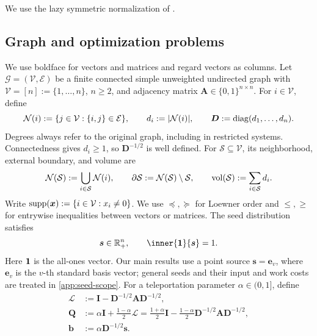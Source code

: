 We use the lazy symmetric normalization of \citet[Section~2, equation~(3)]{fountoulakis2022open}.

\subsection{Graph and optimization problems}
\label{subsec:shared-source-aligned-problem}

We use boldface for vectors and matrices and regard vectors as columns.
Let \(\mathcal{G}=(\mathcal{V},\mathcal{E})\) be a finite connected simple
unweighted undirected graph with \(\mathcal{V}=[n]:=\{1,\ldots,n\}\),
\(n\geq2\), and adjacency matrix \(\bm{A}\in\{0,1\}^{n\times n}\).
For \(i\in\mathcal{V}\), define
\[
    \mathcal N(i):=\{j\in\mathcal{V}:\{i,j\}\in\mathcal{E}\},
    \qquad
    d_i:=|\mathcal N(i)|,
    \qquad
    \bm{D}:=\operatorname{diag}(d_1,\ldots,d_n).
\]
Degrees always refer to the original graph, including in restricted
systems. Connectedness gives \(d_i\geq1\), so \(\bm{D}^{-1/2}\) is well
defined. For \(\mathcal{S}\subseteq\mathcal{V}\), its neighborhood,
external boundary, and volume are
\begin{equation*}
    \mathcal N(\mathcal{S}):=\bigcup_{i\in\mathcal{S}}\mathcal N(i),
    \qquad
    \partial\mathcal{S}:=\mathcal N(\mathcal{S})\setminus\mathcal{S},
    \qquad
    \operatorname{vol}(\mathcal{S}):=\sum_{i\in\mathcal{S}}d_i.
\end{equation*}
Write \(\operatorname{supp}(\bm{x}):=\{i\in\mathcal{V}:x_i\neq0\}\).
We use \(\preceq,\succeq\) for Loewner order and \(\leq,\geq\) for
entrywise inequalities between vectors or matrices. The seed distribution
satisfies
\begin{equation*}
    \bm{s}\in\R_+^n,
    \qquad
    \inner{\one}{\bm{s}}=1.
\end{equation*}
Here \(\mathbf{1}\) is the all-ones vector. Our main results use a point source
\(\bm{s}=\bm{e}_v\), where \(\bm{e}_v\) is the \(v\)-th standard basis
vector; general seeds and their input and work costs are treated in
\cref{app:seed-scope}. For a teleportation parameter \(\alpha\in(0,1]\),
define
\begin{equation}
\begin{aligned}
    \bm{\mathcal L}&:=\bm{I}-\bm{D}^{-1/2}\bm{A}\bm{D}^{-1/2},\\
    \bm{Q}&:=\alpha\bm{I}+\frac{1-\alpha}{2}\bm{\mathcal L}
      =\frac{1+\alpha}{2}\bm{I}
       -\frac{1-\alpha}{2}\bm{D}^{-1/2}\bm{A}\bm{D}^{-1/2},\\
    \bm{b}&:=\alpha\bm{D}^{-1/2}\bm{s}.
\end{aligned}
    \label{eq:shared-pagerank-matrices}
\end{equation}
